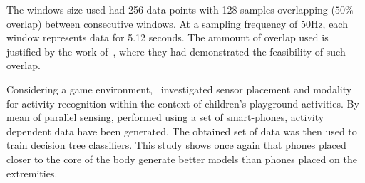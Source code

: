The windows size used had 256 data-points with 128 samples overlapping ($50\%$ overlap) between consecutive windows. At a sampling frequency of 50Hz, each window represents data for 5.12 seconds. The ammount of overlap used is justified by the work of~\cite{bao_activity_2004}, where they had demonstrated the feasibility of such overlap. 




Considering a game environment,~\cite{jablonsky_evaluating_2017} investigated sensor placement and modality for activity recognition within the context of children's playground  activities. By mean of parallel sensing, performed using a set of smart-phones, activity dependent data have been generated. The obtained set of data was then used to train decision tree classifiers. This study shows once again that phones placed closer to the core of the body generate better models than phones placed on the  extremities. 

